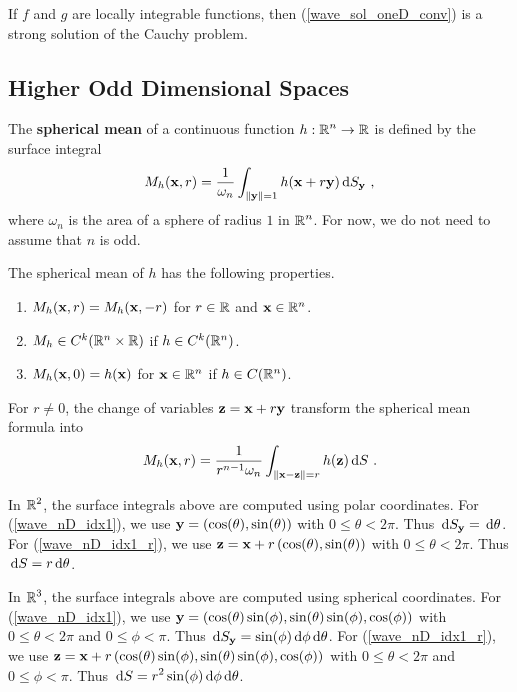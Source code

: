 If $f$ and $g$ are locally integrable functions, then
(\ref{wave_sol_oneD_conv}) is a strong solution of the Cauchy problem.

\subsection{Higher Odd Dimensional Spaces} \label{wave_HODS}

The {\bfseries spherical mean} of a continuous function
$\displaystyle h:\mathbb{R}^n\rightarrow \mathbb{R}$ is defined by the surface integral
\begin{equation} \label{wave_nD_idx1}
M_h(\mathbf{x},r) = \frac{1}{\omega_n} \int_{\|\mathbf{y}\|=1} h(\mathbf{x} + r \mathbf{y}) 
\,\mathrm{d}{S}_{\mathbf{y}} \ ,
\end{equation}
where $\omega_n$ is the area of a sphere of radius $1$ in $\displaystyle \mathbb{R}^n$.
For now, we do not need to assume that $n$ is odd.

The spherical mean of $h$ has the following properties.
\begin{enumerate}
\item $M_h(\mathbf{x},r) = M_h(\mathbf{x},-r)$ for $r\in \mathbb{R}$ and
$\mathbf{x} \in \mathbb{R}^n$.
\item $M_h \in C^k(\mathbb{R}^n\times \mathbb{R})$ if $h \in C^k(\mathbb{R}^n)$.
\item $M_h(\mathbf{x},0) = h(\mathbf{x})$ for $\mathbf{x} \in \mathbb{R}^n$ if
$h \in C(\mathbb{R}^n)$.
\end{enumerate}

For $r\neq 0$, the change of variables $\mathbf{z} = \mathbf{x} + r \mathbf{y}$
transform the spherical mean formula into
\begin{equation} \label{wave_nD_idx1_r}
M_h(\mathbf{x},r) = \frac{1}{r^{n-1} \omega_n}
\int_{\|\mathbf{x}-\mathbf{z}\|=r} h(\mathbf{z}) \,\mathrm{d}{S} \ .
\end{equation}

In $\displaystyle \mathbb{R}^2$, the surface integrals above are computed using polar
coordinates.  For (\ref{wave_nD_idx1}), we use
$\displaystyle \mathbf{y} = \left( \cos(\theta), \sin(\theta) \right)$
with $0\leq \theta < 2\pi$.  Thus
$\displaystyle \,\mathrm{d}{S}_{\mathbf{y}} = \,\mathrm{d}{\theta}$.  For
(\ref{wave_nD_idx1_r}), we use 
$\displaystyle \mathbf{z} = \mathbf{x} + r\left(\cos(\theta),\sin(\theta) \right)$
with $0\leq \theta < 2\pi$.  Thus
$\displaystyle \,\mathrm{d}{S} = r \,\mathrm{d}{\theta}$.

In $\displaystyle \mathbb{R}^3$, the surface integrals above are computed using
spherical coordinates.  For (\ref{wave_nD_idx1}), we use
$\displaystyle \mathbf{y} = \left( \cos(\theta)\sin(\phi) ,
\sin(\theta)\sin(\phi) , \cos(\phi) \right)$
with $0\leq \theta < 2\pi$ and $0\leq \phi < \pi$.  Thus
$\displaystyle \,\mathrm{d}{S}_{\mathbf{y}} = \sin(\phi) \,\mathrm{d}{\phi}\,\mathrm{d}{\theta}$.  For
(\ref{wave_nD_idx1_r}), we use
$\displaystyle \mathbf{z} = \mathbf{x} + r\left(\cos(\theta)\sin(\phi) ,
\sin(\theta)\sin(\phi) , \cos(\phi) \right)$
with $0\leq \theta < 2\pi$ and $0\leq \phi < \pi$.  Thus
$\displaystyle \,\mathrm{d}{S} = r^2 \sin(\phi) \,\mathrm{d}{\phi}\,\mathrm{d}{\theta}$.

